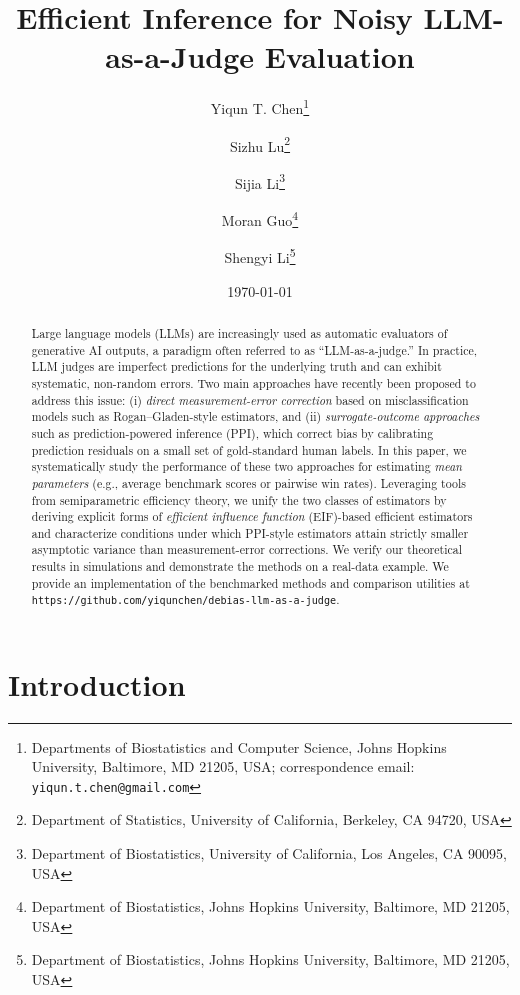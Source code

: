 \documentclass[11pt]{article}
\newcommand{\1}{\mathbf{1}}
\theoremstyle{remark}
\begin{document}
\title{Efficient Inference for Noisy LLM-as-a-Judge Evaluation}
\author{
    Yiqun T. Chen\thanks{Departments of Biostatistics and Computer Science, Johns Hopkins University, Baltimore, MD 21205, USA; correspondence email: \texttt{yiqun.t.chen@gmail.com}}
    \and Sizhu Lu\thanks{Department of Statistics, University of California, Berkeley, CA 94720, USA}
    \and Sijia Li\thanks{Department of Biostatistics, University of California, Los Angeles, CA 90095, USA}
    \and Moran Guo\thanks{Department of Biostatistics, Johns Hopkins University, Baltimore, MD 21205, USA}
    \and Shengyi Li\thanks{Department of Biostatistics, Johns Hopkins University, Baltimore, MD 21205, USA}
}
\date{\today}
\maketitle

\begin{abstract}
Large language models (LLMs) are increasingly used as automatic evaluators of generative AI outputs, a paradigm often referred to as ``LLM-as-a-judge.'' In practice, LLM judges are imperfect predictions for the underlying truth and can exhibit systematic, non-random errors. Two main approaches have recently been proposed to address this issue: (i) \emph{direct measurement-error correction} based on misclassification models such as Rogan--Gladen-style estimators, and (ii) \emph{surrogate-outcome approaches} such as prediction-powered inference (PPI), which correct bias by calibrating prediction residuals on a small set of gold-standard human labels. In this paper, we systematically study the performance of these two approaches for estimating \emph{mean parameters} (e.g., average benchmark scores or pairwise win rates). Leveraging tools from semiparametric efficiency theory, we unify the two classes of estimators by deriving explicit forms of \emph{efficient influence function} (EIF)-based efficient estimators and characterize conditions under which PPI-style estimators attain strictly smaller asymptotic variance than measurement-error corrections. We verify our theoretical results in simulations and demonstrate the methods on a real-data example. We provide an implementation of the benchmarked methods and comparison utilities at \texttt{https://github.com/yiqunchen/debias-llm-as-a-judge}.

\end{abstract}

\section{Introduction}
\label{sec:intro}
\end{document}
